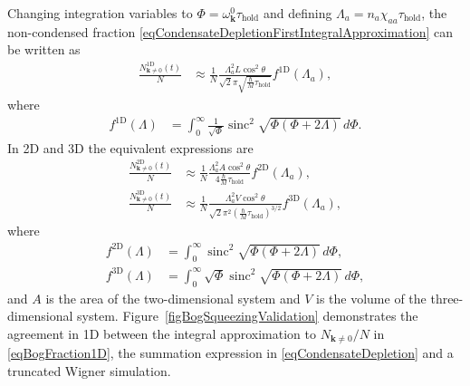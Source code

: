 \documentclass{iopart}
\DeclareMathOperator{\sinc}{sinc}
\begin{document}
Changing integration variables to $\Phi = \omega^{0}_{\mathbf{k}}\tau_\text{hold}$ and defining $\Lambda_a = n_a \chi_{aa} \tau_\text{hold}$, the non-condensed fraction \eqref{eqCondensateDepletionFirstIntegralApproximation} can be written as
\begin{align}
  \frac{N^\text{1D}_{\mathbf{k}\neq 0}(t)}{N} &\approx \frac{1}{N} \frac{\Lambda_a^2 L \cos^2\theta } {\sqrt{2}\pi\sqrt{\frac{\hbar}{M}\tau_\text{hold}}} f^\text{1D}(\Lambda_a), \label{eqBogFraction1D}
\end{align}
where
\begin{align}
  f^\text{1D}(\Lambda) &= \int_0^{\infty} \frac{1}{\sqrt{\Phi}}\sinc^2\sqrt{\Phi(\Phi + 2 \Lambda)}\, d\Phi.
\end{align}
In 2D and 3D the equivalent expressions are
\begin{align}
  \frac{N^{\text{2D}}_{\mathbf{k}\neq 0}(t)}{N} &\approx \frac{1}{N} \frac{\Lambda_a^2 A \cos^2\theta } {4\frac{\hbar}{M}\tau_\text{hold}} f^\text{2D}(\Lambda_a),  \label{eqBogFraction2D}\\
  \frac{N^{\text{3D}}_{\mathbf{k}\neq 0}(t)}{N} &\approx \frac{1}{N} \frac{\Lambda_a^2 V \cos^2\theta } {\sqrt{2}\pi^2\left(\frac{\hbar}{M}\tau_\text{hold}\right)^{3/2}} f^\text{3D}(\Lambda_a), \label{eqBogFraction3D}
\end{align}
where
\begin{align}
  f^\text{2D}(\Lambda) &= \int_0^{\infty} \sinc^2\sqrt{\Phi(\Phi + 2 \Lambda)}\, d\Phi,\\
  f^\text{3D}(\Lambda) &= \int_0^{\infty} \sqrt{\Phi} \sinc^2\sqrt{\Phi(\Phi + 2 \Lambda)}\, d\Phi,
\end{align}
and $A$ is the area of the two-dimensional system and $V$ is the volume of the three-dimensional system.  Figure~\ref{figBogSqueezingValidation} demonstrates the agreement in 1D between the integral approximation to $N_{\mathbf{k}\neq 0}/N$ in \eqref{eqBogFraction1D}, the summation expression in \eqref{eqCondensateDepletion} and a truncated Wigner simulation.
\end{document}
